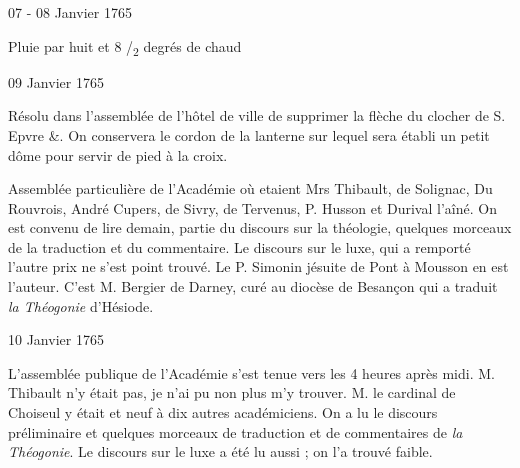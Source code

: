                      \begin{diary}{07 - 08 Janvier 1765}{}




                           Pluie par huit et 8 /\textsubscript{2} degrés de chaud
                        \bigskip


                     \end{diary}
                     \begin{diary}{09 Janvier 1765}{}

                         Résolu dans l'assemblée de
                              l'hôtel de ville de supprimer
                           la flèche du clocher de S.
                              Epvre \&. On conservera
                           le cordon de la lanterne sur lequel sera établi un
                           petit dôme pour servir de pied à la croix. \bigskip


                         Assemblée particulière de l'Académie où etaient
                           Mrs Thibault, de Solignac, Du
                              Rouvrois, André
                           Cupers, de
                              Sivry,
                              de Tervenus, P. Husson et Durival
                              l'aîné. On est convenu de lire demain, partie
                           du discours sur la théologie,
                           quelques morceaux
                           de la traduction et du commentaire. Le
                                 discours sur le
                              luxe, qui a remporté l'autre
                           prix ne s'est point trouvé. Le P.
                              Simonin
                           jésuite de
                           Pont à Mousson en est
                           l'auteur. C'est M. Bergier
                           de Darney, curé au diocèse de
                              Besançon qui
                           a traduit \emph{la Théogonie} d'Hésiode.
                        \bigskip


                     \end{diary}
                     \begin{diary}{10 Janvier 1765}{}

                         L'assemblée publique de l'Académie s'est tenue
                           vers les 4 heures après midi. M.
                              Thibault n'y
                           était pas, je n'ai pu non plus m'y trouver. M.
                              le cardinal de Choiseul y était et neuf à
                           dix autres académiciens. On a lu le discours
                           préliminaire et quelques morceaux de traduction
                           et de commentaires de \emph{la Théogonie}. Le discours
                              sur le luxe a été lu aussi ; on l'a trouvé faible. \bigskip


                     \end{diary}

